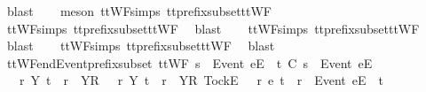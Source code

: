 \begin{isabellebody}
\ blast\isanewline
\ \ \isamarkupfalse%
\ {\isacharparenleft}meson\ ttWF{\isachardot}simps{\isacharparenleft}{}{}{\isacharparenright}\ tt{\isacharunderscore}prefix{\isacharunderscore}subset{\isacharunderscore}ttWF{\isacharparenright}\isanewline
\ \ \isamarkupfalse%
\ ttWF{\isachardot}simps{\isacharparenleft}{}{}{\isacharparenright}\ tt{\isacharunderscore}prefix{\isacharunderscore}subset{\isacharunderscore}ttWF\ \isamarkupfalse%
\ blast\isanewline
\ \ \isamarkupfalse%
\ ttWF{\isachardot}simps{\isacharparenleft}{}{\isacharparenright}\ tt{\isacharunderscore}prefix{\isacharunderscore}subset{\isacharunderscore}ttWF\ \isamarkupfalse%
\ blast\isanewline
\ \ \isamarkupfalse%
\ ttWF{\isachardot}simps{\isacharparenleft}{}{\isacharparenright}\ tt{\isacharunderscore}prefix{\isacharunderscore}subset{\isacharunderscore}ttWF\ \isamarkupfalse%
\ blast%
\endisatagproof
{\isafoldproof}%
%
\isadelimproof
\isanewline
%
\endisadelimproof
\isanewline
{}\isamarkupfalse%
\ ttWF{\isacharunderscore}end{\isacharunderscore}Event{\isacharunderscore}prefix{\isacharunderscore}subset{\isacharcolon}\ {\isachardoublequoteopen}ttWF\ {\isacharparenleft}s\ {\isacharat}\ {\isacharbrackleft}{\isacharbrackleft}Event\ e{\isacharbrackright}\isactrlsub E{\isacharbrackright}{\isacharparenright}\ {\isasymLongrightarrow}\ t\ {\isasymlesssim}\isactrlsub C\ s\ {\isacharat}\ {\isacharbrackleft}{\isacharbrackleft}Event\ e{\isacharbrackright}\isactrlsub E{\isacharbrackright}\ {\isasymLongrightarrow}\ \isanewline
\ \ {\isacharparenleft}{\isasymexists}\ r\ Y{\isachardot}\ t\ {\isacharequal}\ r\ {\isacharat}\ {\isacharbrackleft}{\isacharbrackleft}Y{\isacharbrackright}\isactrlsub R{\isacharbrackright}{\isacharparenright}\ {\isasymor}\ {\isacharparenleft}{\isasymexists}\ r\ Y{\isachardot}\ t\ {\isacharequal}\ r\ {\isacharat}\ {\isacharbrackleft}{\isacharbrackleft}Y{\isacharbrackright}\isactrlsub R{\isacharcomma}\ {\isacharbrackleft}Tock{\isacharbrackright}\isactrlsub E{\isacharbrackright}{\isacharparenright}\ {\isasymor}\ {\isacharparenleft}{\isasymexists}\ r\ e{\isachardot}\ t\ {\isacharequal}\ r\ {\isacharat}\ {\isacharbrackleft}{\isacharbrackleft}Event\ e{\isacharbrackright}\isactrlsub E{\isacharbrackright}{\isacharparenright}\ {\isasymor}\ t\ {\isacharequal}\ {\isacharbrackleft}{\isacharbrackright}{\isachardoublequoteclose}\isanewline
%
\isadelimproof
\ \ %
\endisadelimproof
%
\isatagproof
{}\isamarkupfalse%

\end{isabellebody}
